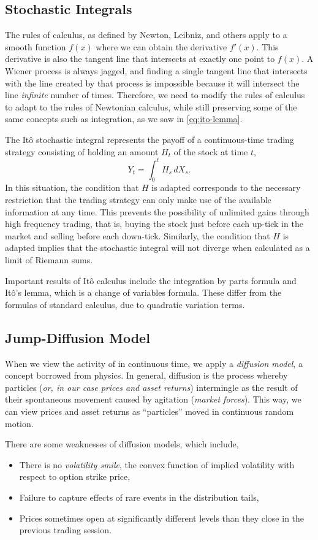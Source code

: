 \subsection{Stochastic Integrals}
The rules of calculus, as defined by Newton, Leibniz, and others apply to a smooth function $f(x)$ where we can obtain the derivative $f'(x)$. This derivative is also the tangent line that intersects at exactly one point to $f(x)$. A Wiener process is always jagged, and finding a single tangent line that intersects with the line created by that process is impossible because it will intersect the line \emph{infinite} number of times.  Therefore, we need to modify the rules of calculus to adapt to the rules of Newtonian calculus, while still preserving some of the same concepts such as integration, as we saw in \eqref{eq:ito-lemma}.

The It\^{o} stochastic integral represents the payoff of a continuous-time  trading strategy consisting of holding an amount $H_t$ of the stock at time $t$, 
\[
Y_t=\int_0^t H_s\,dX_s.
\]
In this situation, the condition that $H$ is adapted corresponds to the necessary restriction that the trading strategy can only make use of the available information at any time. This prevents the possibility of unlimited gains through high frequency trading, that is, buying the stock just before each up-tick in the market and selling before each down-tick. Similarly, the condition that $H$ is adapted implies that the stochastic integral will not diverge when calculated as a limit of Riemann sums.

Important results of It\^{o} calculus include the integration by parts formula and It\^{o}'s lemma, which is a change of variables formula. These differ from the formulas of standard calculus, due to quadratic variation terms.

\subsection{Jump-Diffusion Model}\label{jump-diffusion}
When we view the activity of \fts{} in continuous time, we apply a \emph{diffusion model}, a concept borrowed from physics. In general, diffusion is the process whereby particles (\textit{or, in our case prices and asset returns}) intermingle as the result of their spontaneous movement caused by agitation (\textit{market forces}). This way, we can view prices and asset returns as ``particles'' moved in continuous random motion.

There are some weaknesses of diffusion models, which include,
\begin{itemize}
\item There is no \emph{volatility smile}, the convex function of implied volatility with respect to option strike
price,
\item Failure to capture effects of rare events in the distribution tails,
\item Prices sometimes open at significantly different levels than they close in the previous trading session.
\end{itemize}


